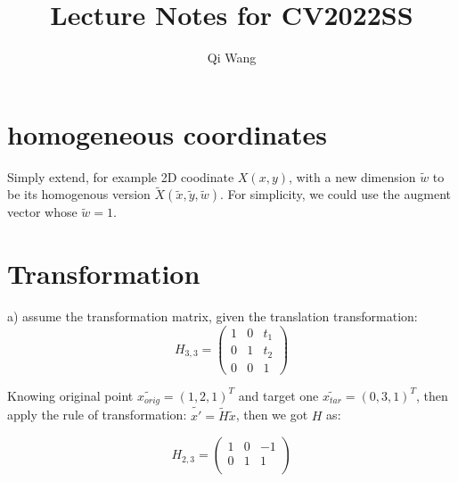 \documentclass{article}
\title{Lecture Notes for CV2022SS}
\author{Qi Wang}
\begin{document}
\maketitle
\section*{homogeneous coordinates}
Simply extend, for example 2D coodinate $X(x,y)$, with a new dimension $\tilde{w}$ to be its homogenous version $\tilde{X}(\tilde{x},\tilde{y},\tilde{w})$. For simplicity, we could use the augment vector whose $\tilde{w} = 1$.
\section*{Transformation}
a) assume the transformation matrix, given the translation transformation:\\

\begin{equation*}
	H_{3,3}=
\begin{pmatrix}
	1 & 0 & t_{1} \\
	0 & 1 & t_{2} \\
	0 & 0 & 1
\end{pmatrix}
\end{equation*}


Knowing original point $\tilde{x_{orig}} = (1,2,1)^T$ and target one $\tilde{x_{tar}} = (0,3,1)^T$, then apply the rule of transformation: $\tilde{x\prime} = \tilde{H} \tilde{x}$, then we got $H$ as:

\begin{equation*}
	H_{2,3} = 
\begin{pmatrix}
	1 & 0 & -1 \\
	0 & 1 & 1 \\
\end{pmatrix}
\end{equation*}
\end{document}
